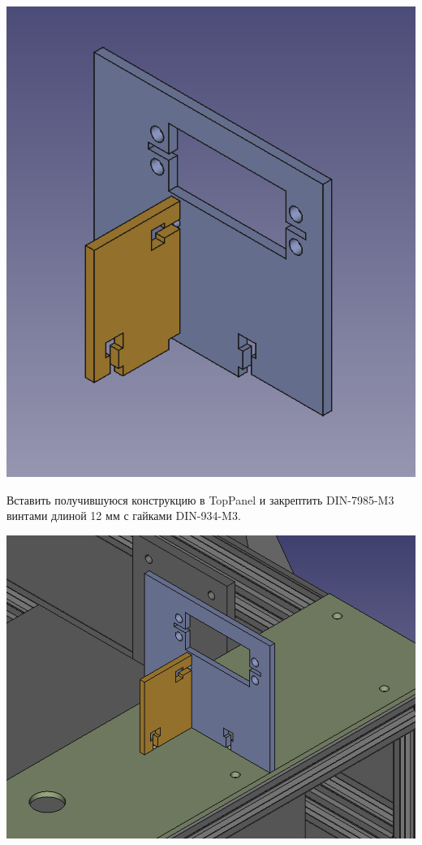\documentclass[12pt,a4paper,oneside]{article}
\begin{document}
\includegraphics[width=\textwidth]{servoholder}

Вставить получившуюся конструкцию в TopPanel и закрептить DIN-7985-M3 винтами
длиной 12 мм с гайками DIN-934-M3.

\includegraphics[width=\textwidth]{servoholder-toppanel}
\end{document}
